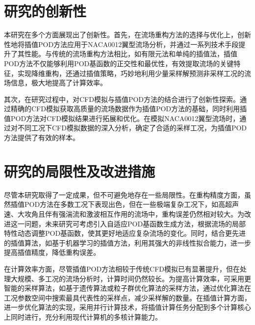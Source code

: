 \section{研究的创新性}
本研究在多个方面展现出了创新性。首先，在流场重构方法的选择与优化上，创新性地将插值POD方法应用于NACA0012翼型流场分析，并通过一系列技术手段提升了其性能。与传统的流场重构方法相比，如有限元法\cite{Zienkiewicz2013}和单纯的插值法\cite{Press2007}，插值POD方法不仅能够利用POD基函数的正交性和最优性，有效提取流场的关键特征，实现降维重构，还通过插值策略，巧妙地利用少量采样解预测非采样工况的流场信息，极大地提高了计算效率。

其次，在研究过程中，对CFD模拟与插值POD方法的结合进行了创新性探索。通过精确的CFD模拟获取高质量的流场数据作为插值POD方法的基础，同时利用插值POD方法对CFD模拟结果进行拓展和优化。在模拟NACA0012翼型流场时，通过对不同工况下CFD模拟数据的深入分析，确定了合适的采样工况，为插值POD方法提供了有效的样本。

\section{研究的局限性及改进措施}
尽管本研究取得了一定成果，但不可避免地存在一些局限性。在重构精度方面，虽然插值POD方法在多数工况下表现出色，但在一些极端复杂工况下，如高超声速、大攻角且伴有强湍流和激波相互作用的流场中，重构误差仍然相对较大\cite{Noack2003}。为改进这一问题，未来研究可考虑引入自适应POD基函数生成方法，根据流场的局部特性动态调整POD基函数，使其更好地适应复杂流场的变化。同时，结合更先进的插值算法，如基于机器学习的插值方法，利用其强大的非线性拟合能力，进一步提高插值精度，降低重构误差。

在计算效率方面，尽管插值POD方法相较于传统CFD模拟已有显著提升，但在处理大规模、多工况的流场分析时，计算时间仍然较长。为提高计算效率，可采用更智能的采样算法，如基于遗传算法或粒子群优化算法的采样方法\cite{Schmidhuber2015}，通过优化算法在工况参数空间中搜索最具代表性的采样点，减少采样解的数量。在插值计算方面，进一步优化算法的实现，采用并行计算技术，将插值计算任务分配到多个计算核心上同时进行，充分利用现代计算机的多核计算能力。
